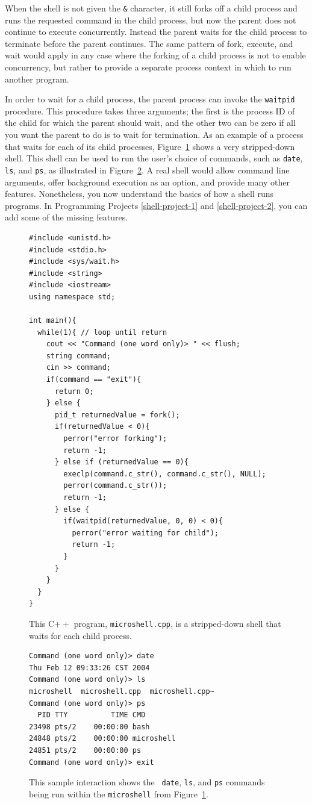 When the shell is not given the \verb|&| character, it still forks off
a child process and runs the requested command in the child process,
but now the parent does not continue to execute concurrently.  Instead
the parent waits for the child process to terminate before the parent
continues.  The same pattern of fork, execute, and wait would apply in
any case where the forking of a child process is not to enable
concurrency, but rather to provide a separate process context
in which to run another program.

In order to wait for a child process, the parent process can invoke
the
\verb|waitpid| procedure.
This procedure takes three arguments; the first is the
process ID of the child for which the parent should wait, and the other two can be zero if
all you want the parent to do is to wait for termination.   As an example of a
process that waits for each of its child processes,
Figure~\ref{microshell-code} shows a very stripped-down shell.  This
shell can be used to run the user's choice of commands, such as
\verb|date|, \verb|ls|, and \verb|ps|, as illustrated in
Figure~\ref{microshell-output}.  A real shell would allow command line
arguments, offer background execution as an option, and provide many
other features.  Nonetheless, you now understand the basics of how
a shell runs programs.  In Programming Projects \ref{shell-project-1}
and \ref{shell-project-2}, you can add some of the missing features.
\begin{figure}
\begin{verbatim}
#include <unistd.h>
#include <stdio.h>
#include <sys/wait.h>
#include <string>
#include <iostream>
using namespace std;

int main(){
  while(1){ // loop until return
    cout << "Command (one word only)> " << flush;
    string command;
    cin >> command;
    if(command == "exit"){
      return 0;
    } else {
      pid_t returnedValue = fork();
      if(returnedValue < 0){
        perror("error forking");
        return -1;
      } else if (returnedValue == 0){
        execlp(command.c_str(), command.c_str(), NULL);
        perror(command.c_str());
        return -1;
      } else {
        if(waitpid(returnedValue, 0, 0) < 0){
          perror("error waiting for child");
          return -1;
        }
      }
    }
  }
}
\end{verbatim}
\caption{This C$++$ program, {\tt microshell.cpp}, is a stripped-down
  shell that waits for each child process.}
\label{microshell-code}
\end{figure}
\begin{figure}
\begin{verbatim}
Command (one word only)> date
Thu Feb 12 09:33:26 CST 2004
Command (one word only)> ls
microshell  microshell.cpp  microshell.cpp~
Command (one word only)> ps
  PID TTY          TIME CMD
23498 pts/2    00:00:00 bash
24848 pts/2    00:00:00 microshell
24851 pts/2    00:00:00 ps
Command (one word only)> exit
\end{verbatim}
\caption{This sample interaction shows the {\tt
  date}, {\tt ls}, and {\tt ps} commands being run within the
  {\tt microshell} from Figure~\ref{microshell-code}.}
\label{microshell-output}
\end{figure}


